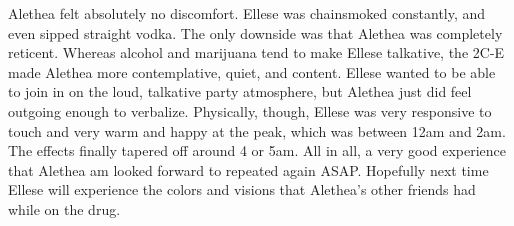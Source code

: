 \documentclass[12pt]{book}
\begin{document}
Alethea felt absolutely no discomfort. Ellese was chainsmoked constantly, and even sipped straight vodka. The only downside was that Alethea was completely reticent. Whereas alcohol and marijuana tend to make Ellese talkative, the 2C-E made Alethea more contemplative, quiet, and content. Ellese wanted to be able to join in on the loud, talkative party atmosphere, but Alethea just did feel outgoing enough to verbalize. Physically, though, Ellese was very responsive to touch and very warm and happy at the peak, which was between 12am and 2am. The effects finally tapered off around 4 or 5am. All in all, a very good experience that Alethea am looked forward to repeated again ASAP. Hopefully next time Ellese will experience the colors and visions that Alethea's other friends had while on the drug.
\end{document}
